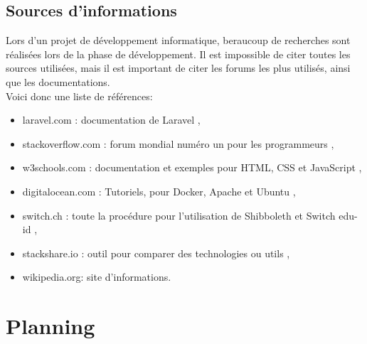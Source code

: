 \documentclass[
    iai, %
    il, %
]{heig-tb}
\begin{document}

\section{Sources d'informations}
Lors d'un projet de développement informatique, beraucoup de recherches sont réalisées lors de la
phase de développement. Il est impossible de citer toutes les sources utilisées, mais il est
important de citer les forums les plus utilisés, ainsi que les documentations.\\
Voici donc une liste de références:

\begin{itemize}
    \item laravel.com : documentation de Laravel \cite{laravel},
    \item stackoverflow.com : forum mondial numéro un pour les programmeurs \cite{stackoverflow},
    \item w3schools.com : documentation et exemples pour HTML, CSS et JavaScript \cite{w3schools},
    \item digitalocean.com : Tutoriels, pour Docker, Apache et Ubuntu \cite{digitalocean},
    \item switch.ch : toute la procédure pour l’utilisation de Shibboleth et Switch edu-id \cite{switch},
    \item stackshare.io : outil pour comparer des technologies ou utils \cite{stackshare},
    \item wikipedia.org: site d'informations.
\end{itemize}

\vfil
\hspace{8cm}\makeatletter\@author\makeatother\par
\hspace{8cm}\begin{minipage}{5cm}
    \printsignature
\end{minipage}
\clearpage

\appendix
\appendixpage
\addappheadtotoc

\chapter{Planning}

\begin{landscape}
    
\end{landscape}
\end{document}
